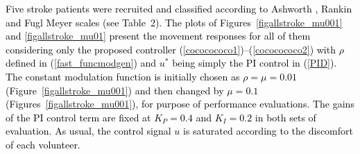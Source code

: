 \documentclass[review]{elsarticle}
\begin{document}
\textcolor{black}{Five stroke patients were recruited and classified according to Ashworth \cite{Bohannon1987206},
Rankin \cite{Wilson20022243} and Fugl Meyer \cite{FuglMeyer197513} scales (see Table~2). The plots of Figures~\ref{figallstroke_mu001} and \ref{figallstroke_mu01} present the movement responses for all of them considering only the proposed controller (\ref{cococococo1})--(\ref{cococococo2}) with $\rho$ defined in (\ref{fast_funcmodgen}) and $u^*$ being simply the PI control in (\ref{PID}). The constant modulation function is initially chosen as $\rho=\mu=0.01$ (Figure~\ref{figallstroke_mu001}) and then changed by $\mu=0.1$ (Figures~\ref{figallstroke_mu001}), for purpose of performance evaluations. The gains of the PI control term are fixed at $K_P=0.4$ and $K_I=0.2$ in both sets of evaluation. As usual, the control signal $u$ is saturated according to the discomfort of each volunteer.} 
%
\end{document}
